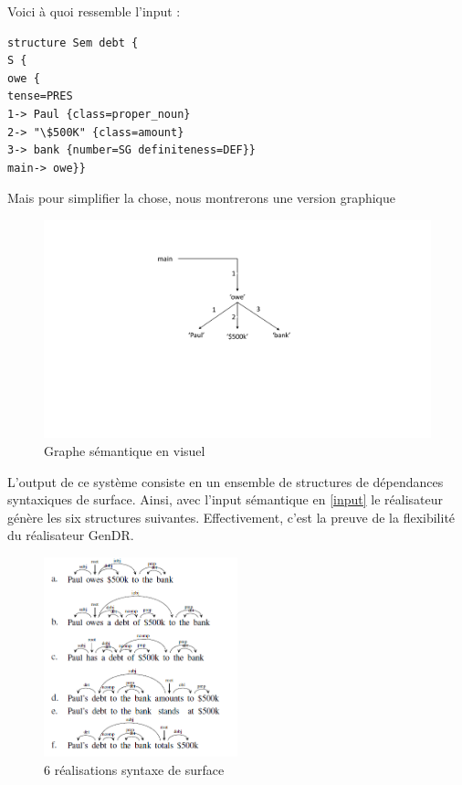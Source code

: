Voici à quoi ressemble l'input :
\begin{lstlisting}[language=XML, caption = Input sémantique, label=input]
structure Sem debt {
S {
owe {
tense=PRES
1-> Paul {class=proper_noun}
2-> "\$500K" {class=amount}
3-> bank {number=SG definiteness=DEF}}
main-> owe}}
\end{lstlisting}

Mais pour simplifier la chose, nous montrerons une version graphique
\begin{figure}[htb]
	\centering
	\includegraphics[width=1\textwidth, trim = {0cm 0cm 0cm 0cm},clip]{ch3/figs/owe_sem.pdf}
	\caption{Graphe sémantique en visuel}
	\label{fig:graphesem}
\end{figure}

L'output de ce système consiste en un ensemble de structures de dépendances syntaxiques de surface. Ainsi, avec l'input sémantique en \ref{input} le réalisateur génère les six structures suivantes. Effectivement, c'est la preuve de la flexibilité du réalisateur GenDR. 

\begin{figure}[htb]
	\centering
	\includegraphics[width=0.5\textwidth, trim = {0cm 0cm 0cm 0cm},clip]{ch3/figs/exemples_real.png}
	\caption{6 réalisations syntaxe de surface}
	\label{fig:realsurf}
\end{figure}

